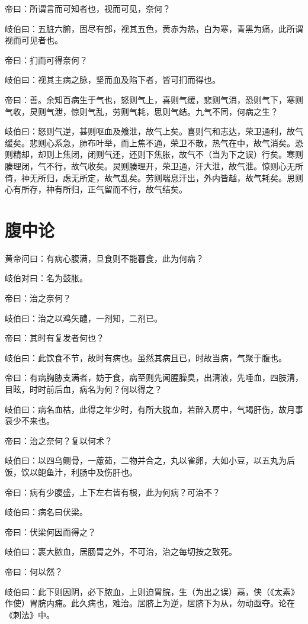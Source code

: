 \documentclass{article}%
\begin{document}
帝曰：所谓言而可知者也，视而可见，奈何？

岐伯曰：五脏六腑，固尽有部，视其五色，黄赤为热，白为寒，青黑为痛，此所谓视而可见者也。

帝曰：扪而可得奈何？

岐伯曰：视其主病之脉，坚而血及陷下者，皆可扪而得也。

帝曰：善。余知百病生于气也，怒则气上，喜则气缓，悲则气消，恐则气下，寒则气收，炅则气泄，惊则气乱，劳则气耗，思则气结。九气不同，何病之生？

岐伯曰：怒则气逆，甚则呕血及飧泄，故气上矣。喜则气和志达，荣卫通利，故气缓矣。悲则心系急，肺布叶举，而上焦不通，荣卫不散，热气在中，故气消矣。恐则精却，却则上焦闭，闭则气还，还则下焦胀，故气不（当为下之误）行矣。寒则腠理闭，气不行，故气收矣。炅则腠理开，荣卫通，汗大泄，故气泄。惊则心无所倚，神无所归，虑无所定，故气乱矣。劳则喘息汗出，外内皆越，故气耗矣。思则心有所存，神有所归，正气留而不行，故气结矣。
\section{腹中论}
黄帝问曰：有病心腹满，旦食则不能暮食，此为何病？

岐伯对曰：名为鼓胀。

帝曰：治之奈何？

岐伯曰：治之以鸡矢醴，一剂知，二剂已。

帝曰：其时有复发者何也？

岐伯曰：此饮食不节，故时有病也。虽然其病且已，时故当病，气聚于腹也。

帝曰：有病胸胁支满者，妨于食，病至则先闻腥臊臭，出清液，先唾血，四肢清，目眩，时时前后血，病名为何？何以得之？

岐伯曰：病名血枯，此得之年少时，有所大脱血，若醉入房中，气竭肝伤，故月事衰少不来也。

帝曰：治之奈何？复以何术？

岐伯曰：以四乌鲗骨，一藘茹，二物并合之，丸以雀卵，大如小豆，以五丸为后饭，饮以鲍鱼汁，利肠中及伤肝也。

帝曰：病有少腹盛，上下左右皆有根，此为何病？可治不？

岐伯曰：病名曰伏梁。

帝曰：伏梁何因而得之？

岐伯曰：裹大脓血，居肠胃之外，不可治，治之每切按之致死。

帝曰：何以然？

岐伯曰：此下则因阴，必下脓血，上则迫胃脘，生（为出之误）鬲，侠（《太素》作使）胃脘内痈。此久病也，难治。居脐上为逆，居脐下为从，勿动亟夺。论在《刺法》中。
\end{document}
